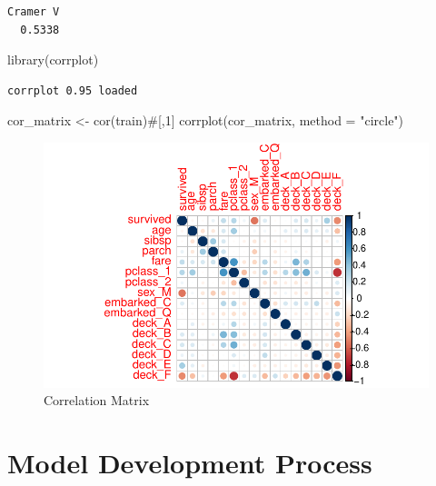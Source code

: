 \documentclass[
  letterpaper,
  DIV=11,
  numbers=noendperiod]{scrartcl}
\newenvironment{Shaded}{\begin{snugshade}}{\end{snugshade}}
\newcommand{\AttributeTok}[1]{\textcolor[rgb]{0.40,0.45,0.13}{#1}}
\newcommand{\CommentTok}[1]{\textcolor[rgb]{0.37,0.37,0.37}{#1}}
\newcommand{\FunctionTok}[1]{\textcolor[rgb]{0.28,0.35,0.67}{#1}}
\newcommand{\NormalTok}[1]{\textcolor[rgb]{0.00,0.23,0.31}{#1}}
\newcommand{\OtherTok}[1]{\textcolor[rgb]{0.00,0.23,0.31}{#1}}
\newcommand{\StringTok}[1]{\textcolor[rgb]{0.13,0.47,0.30}{#1}}
\begin{document}
\begin{verbatim}
Cramer V 
  0.5338 
\end{verbatim}

\begin{Shaded}
\begin{Highlighting}[]
\FunctionTok{library}\NormalTok{(corrplot)}
\end{Highlighting}
\end{Shaded}

\begin{verbatim}
corrplot 0.95 loaded
\end{verbatim}

\begin{Shaded}
\begin{Highlighting}[]
\NormalTok{cor\_matrix }\OtherTok{\textless{}{-}} \FunctionTok{cor}\NormalTok{(train)}\CommentTok{\#[,1]}
\FunctionTok{corrplot}\NormalTok{(cor\_matrix, }\AttributeTok{method =} \StringTok{"circle"}\NormalTok{)}
\end{Highlighting}
\end{Shaded}

\begin{figure}[H]

{\centering \includegraphics{FinalProject_files/figure-pdf/unnamed-chunk-16-1.pdf}

}

\caption{Correlation Matrix}

\end{figure}%

\section{Model Development Process}\label{model-development-process}
\end{document}
